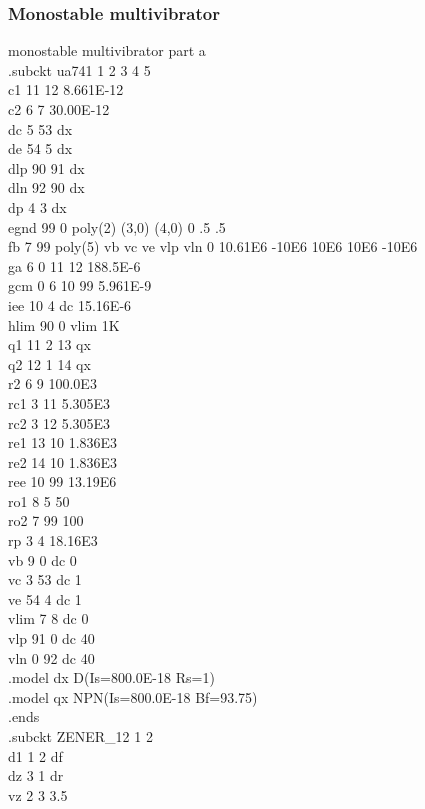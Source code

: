 \documentclass[12pt]{article}
\begin{document}
\subsubsection{Monostable multivibrator}
monostable multivibrator part a\\
.subckt ua741    1  2  3  4  5\\
c1   11 12 8.661E-12\\
c2    6  7 30.00E-12\\
dc    5 53 dx\\
de   54  5 dx\\
dlp  90 91 dx\\
dln  92 90 dx\\
dp    4  3 dx\\
egnd 99  0 poly(2) (3,0) (4,0) 0 .5 .5\\
fb    7 99 poly(5) vb vc ve vlp vln 0 10.61E6 -10E6 10E6 10E6 -10E6\\
ga    6  0 11 12 188.5E-6\\
gcm   0  6 10 99 5.961E-9\\
iee  10  4 dc 15.16E-6\\
hlim 90  0 vlim 1K\\
q1   11  2 13 qx\\
q2   12  1 14 qx\\
r2    6  9 100.0E3\\
rc1   3 11 5.305E3\\
rc2   3 12 5.305E3\\
re1  13 10 1.836E3\\
re2  14 10 1.836E3\\
ree  10 99 13.19E6\\
ro1   8  5 50\\
ro2   7 99 100\\
rp    3  4 18.16E3\\
vb    9  0 dc 0\\
vc    3 53 dc 1\\
ve   54  4 dc 1\\
\newpage
vlim  7  8 dc 0\\
vlp  91  0 dc 40\\
vln   0 92 dc 40\\
.model dx D(Is=800.0E-18 Rs=1)\\
.model qx NPN(Is=800.0E-18 Bf=93.75)\\
.ends\\
.subckt ZENER\_12 1 2\\
d1 1 2 df\\
dz 3 1 dr\\
vz 2 3 3.5\\
\end{document}
